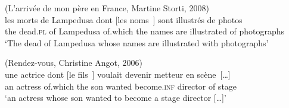 \ex (L'arrivée de mon père en France, Martine Storti, 2008)\\
\gll les morts de Lampedusa dont [les noms~\trace{}] sont illustrés de photos\\
the dead.\textsc{pl} of Lampedusa of.which the names are illustrated of photographs\\
\glt `The dead of Lampedusa whose names are illustrated with photographs'
\label{ex:d2000-subj-passive}

\ex (Rendez-vous, Christine Angot, 2006)\\
\gll une actrice dont [le fils~\trace{}] voulait devenir metteur en scène~[\dots]\\
an actress of.which the son wanted become\textsc{.inf} director of stage\\
\glt `an actress whose son wanted to become a stage director [\dots]'
\label{ex:d2000-subj-unacc}

